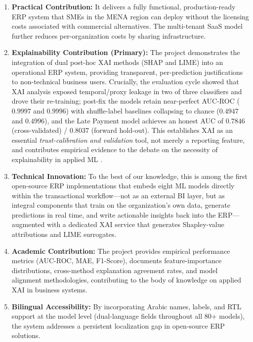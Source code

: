 \documentclass[12pt,a4paper]{report}
\begin{document}
\begin{enumerate}[label=\arabic*.]
  \item \textbf{Practical Contribution:} It delivers a fully functional, production-ready ERP system that SMEs in the MENA region can deploy without the licensing costs associated with commercial alternatives. The multi-tenant SaaS model further reduces per-organization costs by sharing infrastructure.

  \item \textbf{Explainability Contribution (Primary):} The project demonstrates the integration of dual post-hoc XAI methods (SHAP and LIME) into an operational ERP system, providing transparent, per-prediction justifications to non-technical business users. Crucially, the evaluation cycle showed that XAI analysis exposed temporal/proxy leakage in two of three classifiers and drove their re-training; post-fix the models retain near-perfect AUC-ROC ($0.9997$ and $0.9996$) with shuffle-label baselines collapsing to chance ($0.4947$ and $0.4996$), and the Late Payment model achieves an honest AUC of $0.7846$ (cross-validated) / $0.8037$ (forward hold-out). This establishes XAI as an essential \textit{trust-calibration and validation} tool, not merely a reporting feature, and contributes empirical evidence to the debate on the necessity of explainability in applied ML \citep{rudin2019stop}.

  \item \textbf{Technical Innovation:} To the best of our knowledge, this is among the first open-source ERP implementations that embeds eight ML models directly within the transactional workflow---not as an external BI layer, but as integral components that train on the organization's own data, generate predictions in real time, and write actionable insights back into the ERP---augmented with a dedicated XAI service that generates Shapley-value attributions and LIME surrogates.

  \item \textbf{Academic Contribution:} The project provides empirical performance metrics (AUC-ROC, MAE, F1-Score), documents feature-importance distributions, cross-method explanation agreement rates, and model alignment methodologies, contributing to the body of knowledge on applied XAI in business systems.

  \item \textbf{Bilingual Accessibility:} By incorporating Arabic names, labels, and RTL support at the model level (dual-language fields throughout all 80+ models), the system addresses a persistent localization gap in open-source ERP solutions.
\end{enumerate}
\end{document}
